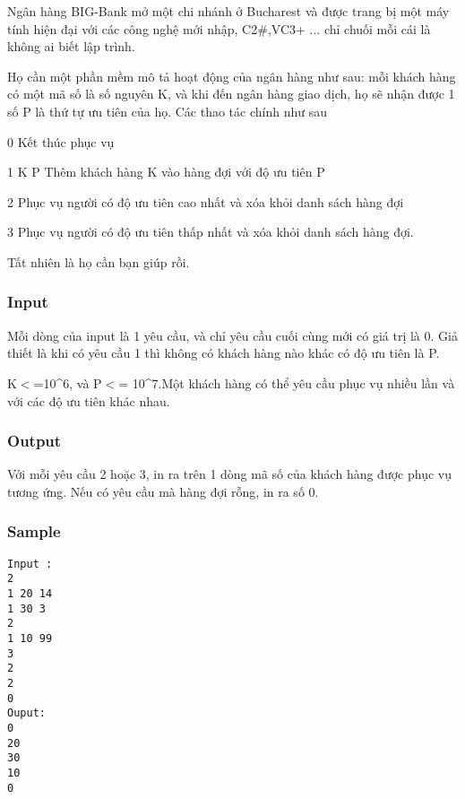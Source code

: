 



   Ngân hàng  BIG-Bank mở một chi nhánh ở Bucharest và được trang bị một máy tính hiện đại với các công nghệ mới nhập, C2\#,VC3+ ... chỉ chuối mỗi cái là không ai biết lập trình.  

   Họ cần một phần mềm mô tả hoạt động của ngân hàng như sau: mỗi khách hàng có một mã số là số nguyên K, và khi đến ngân hàng giao dịch, họ sẽ nhận được 1 số P là thứ tự ưu tiên của họ. Các thao tác chính như sau  

   0  Kết thúc phục vụ  

   1  K P Thêm khách hàng K vào hàng đợi với độ ưu tiên P  

   2  Phục vụ người có độ ưu tiên cao nhất và xóa khỏi danh sách hàng đợi  

   3  Phục vụ người có độ ưu tiên thấp nhất và xóa khỏi danh sách hàng đợi.  

   Tất nhiên là họ cần bạn giúp rồi.  



\subsubsection{   Input  }



   Mỗi dòng của input là 1 yêu cầu, và chỉ yêu cầu cuối cùng mới có giá trị là 0. Giả thiết là khi có yêu cầu 1 thì không có khách hàng nào khác có độ ưu tiên là P.  

   K$<$=10\textasciicircum6, và P$<$= 10\textasciicircum7.Một khách hàng có thể yêu cầu phục vụ nhiều lần và với các độ ưu tiên khác nhau.  



\subsubsection{   Output  }



   Với mỗi yêu cầu 2 hoặc 3, in ra trên 1 dòng mã số của khách hàng được phục vụ tương ứng. Nếu có yêu cầu mà hàng đợi rỗng, in ra số 0.  



\subsubsection{   Sample  }
\begin{verbatim}
Input :
2 
1 20 14 
1 30 3 
2 
1 10 99 
3 
2 
2 
0 
Ouput: 
0 
20 
30 
10 
0 
\end{verbatim}